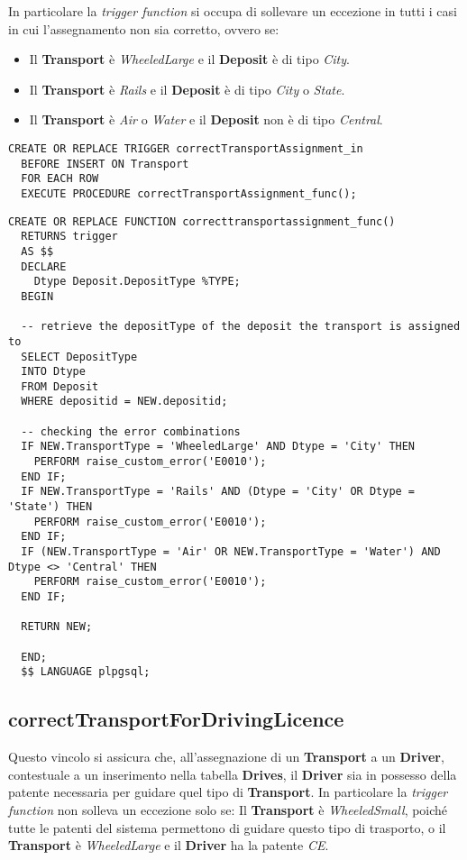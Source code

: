 In particolare la \textit{trigger function} si occupa di sollevare un eccezione in tutti i casi in cui l'assegnamento non sia corretto, ovvero se:
\begin{itemize}
  \item Il \textbf{Transport} è \textit{WheeledLarge} e il \textbf{Deposit} è di tipo \textit{City}.
  \item Il \textbf{Transport} è \textit{Rails} e il \textbf{Deposit} è di tipo \textit{City} o \textit{State}.
  \item Il \textbf{Transport} è \textit{Air} o \textit{Water} e il \textbf{Deposit} non è di tipo \textit{Central}.
\end{itemize}

\begin{lstlisting}[caption={Trigger per il vincolo \textbf{correctTransportAssignment}}]
  CREATE OR REPLACE TRIGGER correctTransportAssignment_in
  BEFORE INSERT ON Transport
  FOR EACH ROW
  EXECUTE PROCEDURE correctTransportAssignment_func();
\end{lstlisting}

\begin{lstlisting}[caption={Funzione per il vincolo \textbf{correctTransportAssignment}}]
  CREATE OR REPLACE FUNCTION correcttransportassignment_func() 
  RETURNS trigger
  AS $$
  DECLARE
    Dtype Deposit.DepositType %TYPE;
  BEGIN

  -- retrieve the depositType of the deposit the transport is assigned to
  SELECT DepositType
  INTO Dtype
  FROM Deposit
  WHERE depositid = NEW.depositid;

  -- checking the error combinations
  IF NEW.TransportType = 'WheeledLarge' AND Dtype = 'City' THEN
    PERFORM raise_custom_error('E0010');
  END IF;
  IF NEW.TransportType = 'Rails' AND (Dtype = 'City' OR Dtype = 'State') THEN
    PERFORM raise_custom_error('E0010');
  END IF;
  IF (NEW.TransportType = 'Air' OR NEW.TransportType = 'Water') AND Dtype <> 'Central' THEN
    PERFORM raise_custom_error('E0010');
  END IF;

  RETURN NEW;

  END;
  $$ LANGUAGE plpgsql;
\end{lstlisting}

\subsection{\textbf{correctTransportForDrivingLicence}}

Questo vincolo si assicura che, all'assegnazione di un \textbf{Transport} a un \textbf{Driver}, contestuale a un inserimento nella tabella \textbf{Drives}, il \textbf{Driver} sia in possesso della patente necessaria per guidare quel tipo di \textbf{Transport}.
In particolare la \textit{trigger function} non solleva un eccezione solo se:
 Il \textbf{Transport} è \textit{WheeledSmall}, poiché tutte le patenti del sistema permettono di guidare questo tipo di trasporto, o il \textbf{Transport} è \textit{WheeledLarge} e il \textbf{Driver} ha la patente \textit{CE}.

